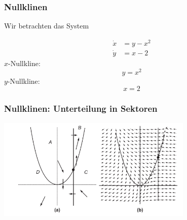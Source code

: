 \documentclass[ngerman, aspectratio=169]{beamer}
\begin{document}
    \begin{frame}
    \frametitle{Nullklinen}
        Wir betrachten das System

        \begin{align*}
            \dot{x} &= y - x^2 \\
            \dot{y} &= x - 2
        \end{align*}
        \pause
        $x$-Nullkline:
        \begin{equation*}
            y = x^2
        \end{equation*}
        \pause
        $y$-Nullkline:
        \begin{equation*}
            x = 2
        \end{equation*}
    \end{frame}
    \begin{frame}
    \frametitle{Nullklinen: Unterteilung in Sektoren}
        \begin{center}
            \includegraphics[width=0.7\textwidth]{../images/nullklinen.pdf}
        \end{center}
    \end{frame}
\end{document}
